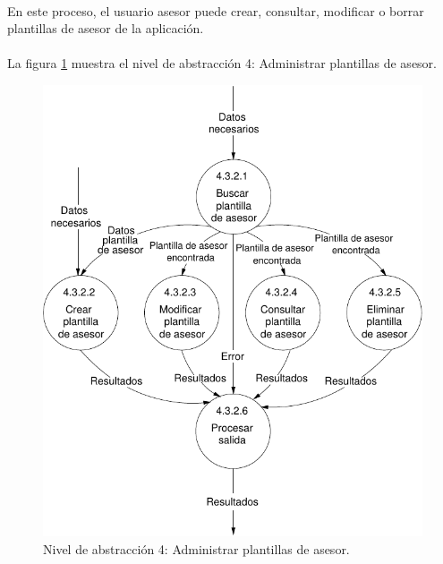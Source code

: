 \paragraph{}En este proceso, el usuario asesor puede crear, consultar, modificar
o borrar plantillas de asesor de la aplicación.

\paragraph{}La figura \ref{diagramaNivel4-AdministrarPlantillasAsesor}
muestra el nivel de abstracción 4: Administrar plantillas de asesor.

  \begin{figure}[!ht]
    \begin{center}
      \includegraphics[]{08.Analisis_Funcional/8.2.DFDs/Niveles/Nivel4/Asesor/AdministrarPlantillasAsesor/Diagramas/nivel4-AdministrarPlantillasAsesor.pdf}
      \caption{Nivel de abstracción 4: Administrar plantillas de asesor.}
      \label{diagramaNivel4-AdministrarPlantillasAsesor}
    \end{center}
  \end{figure}
